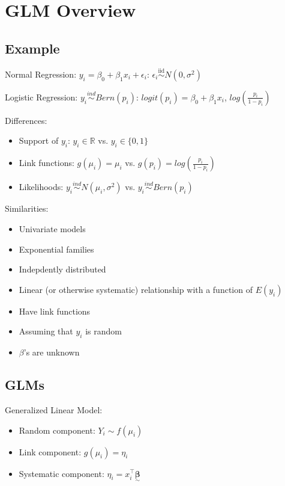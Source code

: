 \documentclass{article}
\newcommand{\svec}[1]{\underset{\sim}{\bm{#1}}} %
\newcommand{\real}{\mathbb{R}} %
\newcommand{\xitb}{x_i^{\top}\svec{\beta}}
\newcommand{\iiddist}{\overset{\mathrm{iid}}{\sim}}
\begin{document}
\tableofcontents

\newpage

\section{GLM Overview}

\subsection{Example}
Normal Regression: $y_i = \beta_0 + \beta_1 x_i + \epsilon_i$: $\epsilon_i \iiddist N(0, \sigma^2)$

Logistic Regression: $y_i \overset{ind}{\sim} Bern(p_i)$: $logit(p_i) = \beta_0 + \beta_1 x_i$, $ log(\frac{p_i}{1-p_i})$

Differences: 
\begin{itemize}
    \item Support of $y_i$: $y_i \in \real$ vs. $y_i \in \{0, 1\}$
    \item Link functions: $g(\mu_i) = \mu_i$ vs. $g(p_i) = log(\frac{p_i}{1-p_i})$
    \item Likelihoods: $y_i \overset{ind}{\sim} N(\mu_i, \sigma^2)$ vs. $y_i \overset{ind}{\sim} Bern(p_i)$
\end{itemize}

Similarities:
\begin{itemize}
    \item Univariate models
    \item Exponential families
    \item Indepdently distributed
    \item Linear (or otherwise systematic) relationship with a function of $E(y_i)$
    \item Have link functions
    \item Assuming that $y_i$ is random
    \item $\beta$'s are unknown
\end{itemize}
    

\subsection{GLMs}
Generalized Linear Model:

\begin{itemize}
    \item Random component: $Y_i \sim f(\mu_i)$
    \item Link component: $g(\mu_i) = \eta_i$
    \item Systematic component: $\eta_i = \xitb$
\end{itemize}
\end{document}
